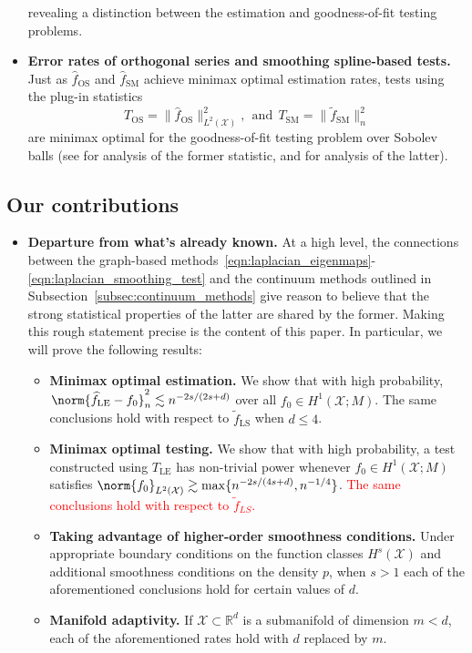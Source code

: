 \documentclass{article}
\newcommand{\Reals}{\mathbb{R}}
\newcommand{\1}{\mathbf{1}}
\newcommand{\Rd}{\Reals^d}
\newcommand{\Xset}{\mathcal{X}}
\newcommand{\Leb}{L}
\newcommand{\mc}[1]{\mathcal{#1}}
\newcommand{\wt}[1]{\widetilde{#1}}
\newcommand{\wh}[1]{\widehat{#1}}
\newcommand{\LE}{\mathrm{LE}}
\newcommand{\LS}{\mathrm{LS}}
\newcommand{\SM}{\mathrm{SM}}
\newcommand{\OS}{\mathrm{OS}}
\theoremstyle{alden}
\theoremstyle{aldenthm}
\theoremstyle{definition}
\theoremstyle{remark}
\begin{document}
\begin{itemize}
\begin{equation*}
	\end{equation*}
	revealing a distinction between the estimation and goodness-of-fit testing problems.
	\item \textbf{Error rates of orthogonal series and smoothing spline-based tests.} 
	Just as $\wh{f}_{\OS}$ and $\wh{f}_{\SM}$ achieve minimax optimal estimation rates, tests using the plug-in statistics
	\begin{equation*}
	T_{\OS} = \bigl\|\wh{f}_{\OS}\bigr\|_{\Leb^2(\Xset)}^2,~~\textrm{and}~~T_{\SM} = \bigl\|\wt{f}_{\SM}\bigr\|_{n}^2
	\end{equation*}
	are minimax optimal for the goodness-of-fit testing problem over Sobolev balls (see \citet{ingster2009} for analysis of the former statistic, and \citet{liu2019} for analysis of the latter).
\end{itemize}

\subsection{Our contributions}
\label{subsec:our_contributions}

\begin{itemize}
	\item \textbf{Departure from what's already known.} At a high level, the connections between the graph-based methods~\eqref{eqn:laplacian_eigenmaps}-\eqref{eqn:laplacian_smoothing_test} and the continuum methods outlined in Subsection~\ref{subsec:continuum_methods} give reason to believe that the strong statistical properties of the latter are shared by the former. Making this rough statement precise is the content of this paper. In particular, we will prove the following results:
	\begin{itemize}
		\item \textbf{Minimax optimal estimation.}
		We show that with high probability, $\norm{\wh{f}_{\LE} - f_0}_{n}^2 \lesssim n^{-2s/(2s + d)}$ over all $f_0 \in H^1(\Xset;M)$. The same conclusions hold with respect to $\wt{f}_{\LS}$ when $d \leq 4$. 
		\item \textbf{Minimax optimal testing.}
		We show that with high probability, a test constructed using $T_{\LE}$ has non-trivial power whenever $f_0 \in H^1(\Xset;M)$ satisfies $\norm{f_0}_{\Leb^2(\Xset)} \gtrsim \max\{n^{-2s/(4s + d)},n^{-1/4}\}$. \textcolor{red}{The same conclusions hold with respect to $\wt{f}_{LS}$.}
		\item \textbf{Taking advantage of higher-order smoothness conditions.} Under appropriate boundary conditions on the function classes $H^s(\Xset)$ and additional smoothness conditions on the density $p$, when $s > 1$  each of the aforementioned conclusions hold for certain values of $d$.
		\item \textbf{Manifold adaptivity.}
		If $\mc{X} \subset \Rd$ is a submanifold of dimension $m < d$, each of the aforementioned rates hold with $d$ replaced by $m$.
	\end{itemize}	
\end{itemize}
\end{document}
